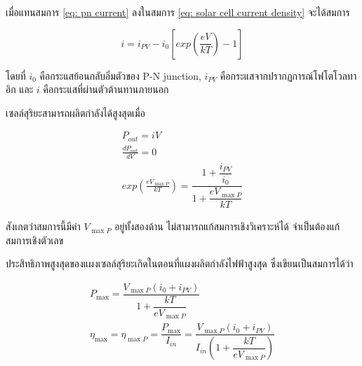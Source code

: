 \message{ !name(solar.tex)}\documentclass[
a4paper,
svgnames,
openany,
justified,
]{tufte-book}
\begin{document}
เมื่อแทนสมการ \ref{eq: pn current} ลงในสมการ \ref{eq: solar cell current density} จะได้สมการ

\begin{equation}
  \label{eq: solar cell current}
    i = i_{PV} - i_0\left[exp \left( \frac{eV}{kT} \right) - 1 \right]
\end{equation}

โดยที่ $i_0$ คือกระแสย้อนกลับอิ่มตัวของ P-N junction, $i_{PV}$ คือกระแสจากปรากฏการณ์โฟโตโวลทาอิก และ $i$ คือกระแสที่ผ่านตัวต้านทานภายนอก 

เซลล์สุริยะสามารถผลิตกำลังได้สูงสุดเมื่อ

\begin{gather}
  \label{eq: max solar cell power}
   	P_{out} = i V \nonumber \\
    \frac{dP_{out}}{dV} = 0 \nonumber \\
   	exp \left(\frac{e V_{\max P}}{kT} \right) = \dfrac{1+\dfrac{i_{PV}}{i_0}}{1+ \dfrac{e V_{\max P}}{kT}}
\end{gather}

สังเกตว่าสมการนี้มีค่า $V_{\max P}$ อยู่ทั้งสองด้าน ไม่สามารถแก้สมการเชิงวิเคราะห์ได้ จำเป็นต้องแก้สมการเชิงตัวเลข

ประสิทธิภาพสูงสุดของแผงเซลล์สุริยะเกิดในตอนที่แผงผลิตกำลังไฟฟ้าสูงสุด ซึ่งเขียนเป็นสมการได้ว่า

\begin{gather}
  \label{eq: solar cell max eff}
  P_{\max} =  \dfrac{V_{\max P} ( i_0 + i_{PV} )}{1 + \dfrac{kT}{e V_{\max P}}} \\
  \eta_{\max} = \eta_{\max P} =  \dfrac{P_{\max}}{I_{in}} = \dfrac{V_{\max P} ( i_0 + i_{PV} )}{I_{in} \left(1 + \dfrac{kT}{e V_{\max P}} \right)}
\end{gather}
\end{document}
